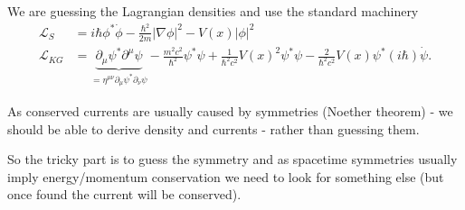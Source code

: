 \documentclass[../main.tex]{subfiles}
\begin{document}
We are guessing the Lagrangian densities and use the standard machinery
\begin{align}
\mathcal{L}_S&=i\hbar\phi^*\dot{\phi}-\frac{\hbar^2}{2m}|\nabla\phi|^2-V(x)|\phi|^2\\
\mathcal{L}_{KG}&=\underbrace{\partial_\mu\psi^*\partial^\mu\psi}_{=\eta^{\mu\nu}\partial_\mu\psi^*\partial_\nu\psi}-\frac{m^2c^2}{\hbar^2}\psi^*\psi+\frac{1}{\hbar^2c^2}V(x)^2\psi^*\psi-\frac{2}{\hbar^2c^2}V(x)\psi^*(i\hbar)\dot{\psi}.
\end{align}

As conserved currents are usually caused by symmetries (Noether theorem) - we should be able to derive density and currents - rather than guessing them.

So the tricky part is to guess the symmetry and as spacetime symmetries usually imply energy/momentum conservation we need to look for something else (but once found the current will be conserved).
\end{document}
